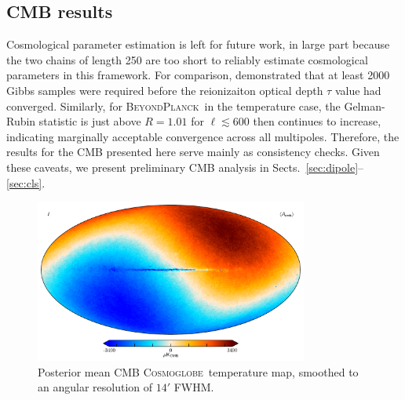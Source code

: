 \documentclass[twocolumn]{../../common/aa}
\newcommand{\bp}{\textsc{BeyondPlanck}}
\newcommand{\cosmoglobe}{\textsc{Cosmoglobe}}
\begin{document}
\subsection{CMB results}
\label{sec:cmb}

Cosmological parameter estimation is left for future work, in large part because the two chains of length 250 are too short to reliably estimate cosmological parameters in this framework. For comparison, \citet{bp12} demonstrated that at least 2000 Gibbs samples were required before the reionizaiton optical depth $\tau$ value had converged. Similarly, for \bp\ in the temperature case, the Gelman-Rubin statistic is just above $R=1.01$ for $\ell\lesssim600$ then continues to increase, indicating marginally acceptable convergence across all multipoles. Therefore, the results for the CMB presented here serve mainly as consistency checks. Given these caveats, we present preliminary CMB analysis in Sects.~\ref{sec:dipole}--\ref{sec:cls}.


\begin{figure}
	\centering
	\includegraphics[width=0.8\textwidth]{figures/cmb_I_dipole.pdf}
	\caption{Posterior mean CMB \cosmoglobe\ temperature map, smoothed to an angular resolution of $14'$ FWHM.}
\end{figure}
\end{document}
